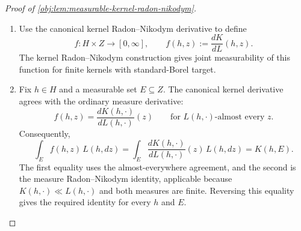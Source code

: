 \begin{proof}[Proof of \cref{obj:lem:measurable-kernel-radon-nikodym}]
\begin{enumerate}
\item Use the canonical kernel Radon--Nikodym derivative to define
\[
f:H\times Z\longrightarrow[0,\infty],
\qquad
f(h,z):=\frac{dK}{dL}(h,z).
\]
The kernel Radon--Nikodym construction gives joint measurability of this function for finite kernels with standard-Borel target. %

\item Fix \(h\in H\) and a measurable set \(E\subseteq Z\). The canonical kernel derivative agrees with the ordinary measure derivative:
\[
f(h,z)
=
\frac{dK(h,\cdot)}{dL(h,\cdot)}(z)
\qquad\text{for \(L(h,\cdot)\)-almost every \(z\)}.
\]
Consequently,
\[
\int_E f(h,z)\,L(h,dz)
=
\int_E
\frac{dK(h,\cdot)}{dL(h,\cdot)}(z)\,L(h,dz)
=
K(h,E).
\]
The first equality uses the almost-everywhere agreement, and the second is the measure Radon--Nikodym identity, applicable because \(K(h,\cdot)\ll L(h,\cdot)\) and both measures are finite. Reversing this equality gives the required identity for every \(h\) and \(E\). %
\end{enumerate}
\end{proof}
